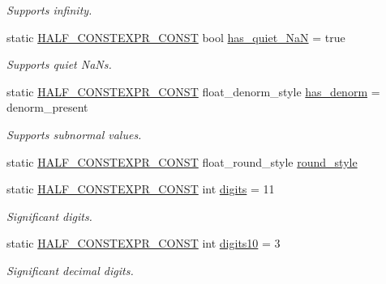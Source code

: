 \begin{DoxyCompactItemize}
\begin{DoxyCompactList}\small\item\em Supports infinity. \end{DoxyCompactList}\item 
static \hyperlink{half_8hpp_a5df92c245e5d4e45d35fad7b6de73354}{H\+A\+L\+F\+\_\+\+C\+O\+N\+S\+T\+E\+X\+P\+R\+\_\+\+C\+O\+N\+ST} bool \hyperlink{classstd_1_1numeric__limits_3_01half__float_1_1half_01_4_a83611ff822d78d69ed6fd58c4ba48c33}{has\+\_\+quiet\+\_\+\+NaN} = true
\begin{DoxyCompactList}\small\item\em Supports quiet Na\+Ns. \end{DoxyCompactList}\item 
static \hyperlink{half_8hpp_a5df92c245e5d4e45d35fad7b6de73354}{H\+A\+L\+F\+\_\+\+C\+O\+N\+S\+T\+E\+X\+P\+R\+\_\+\+C\+O\+N\+ST} float\+\_\+denorm\+\_\+style \hyperlink{classstd_1_1numeric__limits_3_01half__float_1_1half_01_4_a120d8b8b5e5c5d5ba0d7d3802859ee4f}{has\+\_\+denorm} = denorm\+\_\+present
\begin{DoxyCompactList}\small\item\em Supports subnormal values. \end{DoxyCompactList}\item 
static \hyperlink{half_8hpp_a5df92c245e5d4e45d35fad7b6de73354}{H\+A\+L\+F\+\_\+\+C\+O\+N\+S\+T\+E\+X\+P\+R\+\_\+\+C\+O\+N\+ST} float\+\_\+round\+\_\+style \hyperlink{classstd_1_1numeric__limits_3_01half__float_1_1half_01_4_a17a70ce9e02f8b890a0ebf5eb04c385b}{round\+\_\+style}
\item 
static \hyperlink{half_8hpp_a5df92c245e5d4e45d35fad7b6de73354}{H\+A\+L\+F\+\_\+\+C\+O\+N\+S\+T\+E\+X\+P\+R\+\_\+\+C\+O\+N\+ST} int \hyperlink{classstd_1_1numeric__limits_3_01half__float_1_1half_01_4_a25dd523e9495b75166757d5f73197068}{digits} = 11
\begin{DoxyCompactList}\small\item\em Significant digits. \end{DoxyCompactList}\item 
static \hyperlink{half_8hpp_a5df92c245e5d4e45d35fad7b6de73354}{H\+A\+L\+F\+\_\+\+C\+O\+N\+S\+T\+E\+X\+P\+R\+\_\+\+C\+O\+N\+ST} int \hyperlink{classstd_1_1numeric__limits_3_01half__float_1_1half_01_4_adb8ec10ec96a1c60db49b40554fb13ef}{digits10} = 3
\begin{DoxyCompactList}\small\item\em Significant decimal digits. \end{DoxyCompactList}\item 

\end{DoxyCompactItemize}
